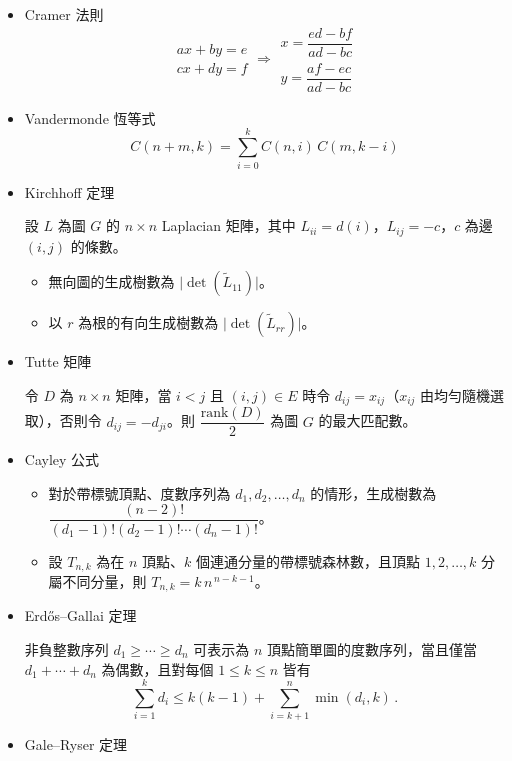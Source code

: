 \begin{itemize}
\item Cramer 法則
$$
\begin{aligned}ax+by=e\\cx+dy=f\end{aligned}
\Rightarrow
\begin{aligned}x=\dfrac{ed-bf}{ad-bc}\\y=\dfrac{af-ec}{ad-bc}\end{aligned}
$$

\item Vandermonde 恆等式
$$
C(n+m,k)=\sum_{i=0}^{k} C(n,i)\,C(m,k-i)
$$

\item Kirchhoff 定理

設 $L$ 為圖 $G$ 的 $n\times n$ Laplacian 矩陣，其中 $L_{ii}=d(i)$，$L_{ij}=-c$，$c$ 為邊 $(i,j)$ 的條數。
\begin{itemize}
    \item 無向圖的生成樹數為 $\lvert \det(\tilde{L}_{11}) \rvert$。
    \item 以 $r$ 為根的有向生成樹數為 $\lvert \det(\tilde{L}_{rr}) \rvert$。
\end{itemize}

\item Tutte 矩陣

令 $D$ 為 $n\times n$ 矩陣，當 $i<j$ 且 $(i,j)\in E$ 時令 $d_{ij}=x_{ij}$（$x_{ij}$ 由均勻隨機選取），否則令 $d_{ij}=-d_{ji}$。則 $\dfrac{\mathrm{rank}(D)}{2}$ 為圖 $G$ 的最大匹配數。

\item Cayley 公式

\begin{itemize}
  \item 對於帶標號頂點、度數序列為 $d_1,d_2,\ldots,d_n$ 的情形，生成樹數為 $\dfrac{(n-2)!}{(d_1-1)!(d_2-1)!\cdots(d_n-1)!}$。
  \item 設 $T_{n,k}$ 為在 $n$ 頂點、$k$ 個連通分量的帶標號森林數，且頂點 $1,2,\ldots,k$ 分屬不同分量，則 $T_{n,k}=k\,n^{\,n-k-1}$。
\end{itemize}

\item Erdős–Gallai 定理

非負整數序列 $d_1\ge\cdots\ge d_n$ 可表示為 $n$ 頂點簡單圖的度數序列，當且僅當 $d_1+\cdots+d_n$ 為偶數，且對每個 $1\le k\le n$ 皆有
\[
\textstyle\sum_{i=1}^k d_i \le k(k-1)+\sum_{i=k+1}^n \min(d_i,k)\,.
\]

\item Gale–Ryser 定理


\end{itemize}
